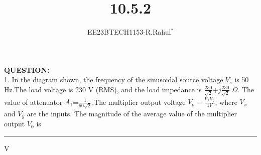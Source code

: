 \documentclass[journal,12pt,twocolumn]{IEEEtran}
\theoremstyle{remark}
\begin{document}

\vspace{3cm}
\title{\textbf{10.5.2}}
\author{EE23BTECH1153-R.Rahul$^{*}$%
}
\maketitle
\newpage
\bigskip

\textbf{QUESTION:}\\
1. In the diagram shown, the frequency of the sinusoidal source voltage $V_s$ is 50 Hz.The load voltage is 230 V (RMS), and the load impedance is $\frac{230}{\sqrt{2}}$+$j\frac{230}{\sqrt{2}}$ $\Omega$. The value of attenuator $A_1$=$\frac{1}{50\sqrt{2}}$.The multiplier output voltage $V_o=\frac{V_xV_y}{1V}$, where $V_x$ and $V_y$ are the inputs. The magnitude of the average value of the multiplier output $V_0$ is \hspace{3cm}\rule{5cm}{0.4pt} V
\end{document}
